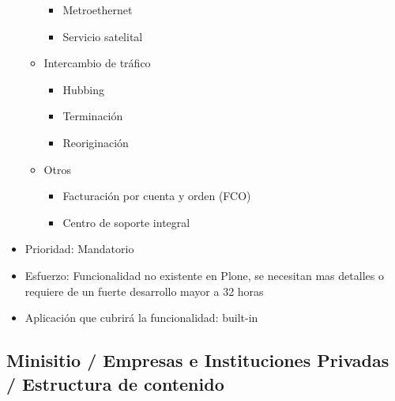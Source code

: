 \documentclass[11pt, letterpaper, oneside, spanish]{scrbook}
\begin{document}
\begin{itemize}
\begin{itemize}
\begin{itemize}
\item Metroethernet
\item Servicio satelital
\end{itemize}
\item Intercambio de tráfico
\begin{itemize}
\item Hubbing
\item Terminación
\item Reoriginación
\end{itemize}
\item Otros
\begin{itemize}
\item Facturación por cuenta y orden (FCO)
\item Centro de soporte integral
\end{itemize}
\end{itemize}
\item Prioridad: Mandatorio
\item Esfuerzo: Funcionalidad no existente en Plone, se necesitan mas detalles o
  requiere de un fuerte desarrollo mayor a 32 horas
\item Aplicación que cubrirá la funcionalidad:  built-in
\end{itemize}
\subsection{Minisitio / Empresas e Instituciones Privadas / Estructura de contenido}
\label{sec-2-1-37}
\end{document}
